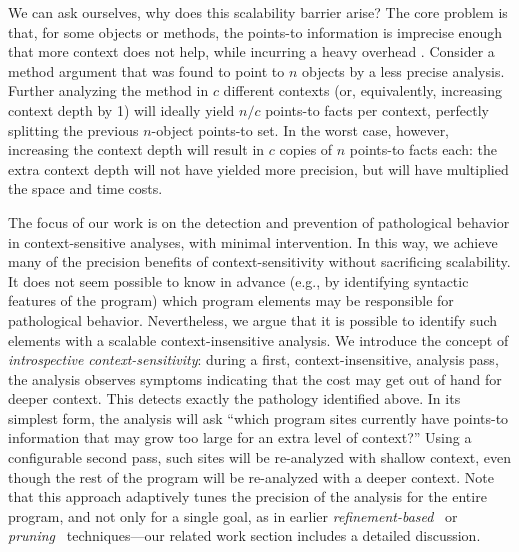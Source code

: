 We can ask ourselves, why does this scalability barrier arise? The
core problem is that, for some objects or methods, the points-to
information is imprecise enough that more context does not help, while
incurring a heavy overhead \cite{pointsto-popl11}. Consider a method
argument that was found to point to $n$ objects by a less precise
analysis. Further analyzing the method in $c$ different contexts (or,
equivalently, increasing context depth by 1) will ideally yield $n/c$
points-to facts per context, perfectly splitting the previous
$n$-object points-to set.
In the worst case, however, increasing the context depth will result
in $c$ copies of $n$ points-to facts each: the extra context depth
will not have yielded more precision, but will have multiplied the
space and time costs.

The focus of our work is on the detection and prevention of
pathological behavior in context-sensitive analyses, with minimal
intervention. In this way, we achieve many of the precision benefits
of context-sensitivity without sacrificing scalability. It does not
seem possible to know in advance (e.g., by identifying syntactic
features of the program) which program elements may be responsible for
pathological behavior. Nevertheless, we argue that it is possible to
identify such elements with a scalable context-insensitive analysis.
We introduce the concept of \emph{introspective context-sensitivity}:
during a first, context-insensitive, analysis pass, the analysis
observes symptoms indicating that the cost may get out of hand for
deeper context. This detects exactly the pathology identified
above. In its simplest form, the analysis will ask ``which program
sites currently have points-to information that may grow too large for
an extra level of context?''  Using a configurable second pass, such
sites will be re-analyzed with shallow context, even though the rest
of the program will be re-analyzed with a deeper context. Note that
this approach adaptively tunes the precision of the analysis for the
entire program, and not only for a single goal, as in earlier
\emph{refinement-based}~\cite{1134027} or
\emph{pruning}~\cite{Liang:2011:SAR:1993498.1993567} techniques---our
related work section includes a detailed discussion.



